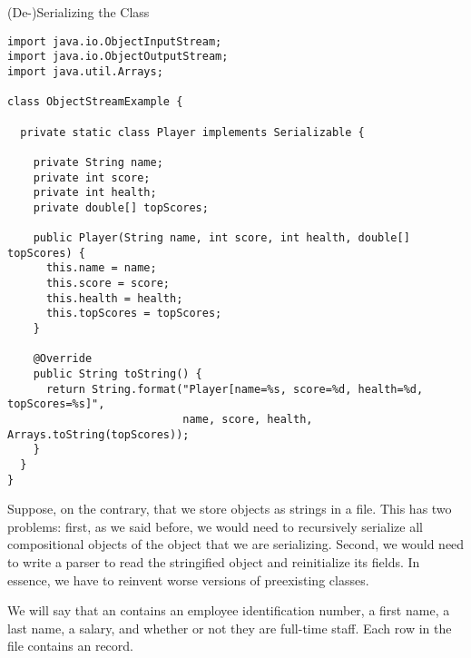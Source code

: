 \begin{cl}[]{(De-)Serializing the  Class}
\begin{lstlisting}[language=MyJava]
import java.io.ObjectInputStream;
import java.io.ObjectOutputStream;
import java.util.Arrays;

class ObjectStreamExample {

  private static class Player implements Serializable {

    private String name;
    private int score;
    private int health;
    private double[] topScores;
    
    public Player(String name, int score, int health, double[] topScores) {
      this.name = name;
      this.score = score;
      this.health = health;
      this.topScores = topScores;
    }
    
    @Override
    public String toString() {
      return String.format("Player[name=%s, score=%d, health=%d, topScores=%s]", 
                           name, score, health, Arrays.toString(topScores));
    }
  }
}
\end{lstlisting}
\end{cl}

Suppose, on the contrary, that we store objects as strings in a file. This has two problems: first, as we said before, we would need to recursively serialize all compositional objects of the object that we are serializing. Second, we would need to write a parser to read the stringified object and reinitialize its fields. In essence, we have to reinvent worse versions of preexisting classes.


We will say that an  contains an employee identification number, a first name, a last name, a salary, and whether or not they are full-time staff. Each row in the file contains an  record.

